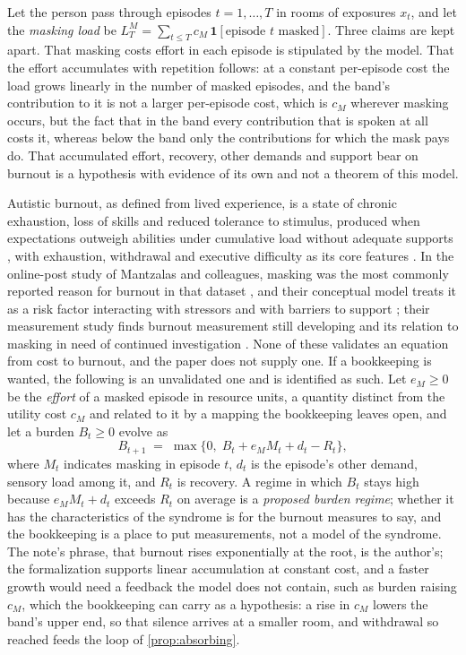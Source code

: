 Let the person pass through episodes $t = 1, \ldots, T$ in rooms of exposures $x_t$, and let the \emph{masking load} be $L^{M}_T = \sum_{t \le T} c_M\,\mathbf{1}[\text{episode } t \text{ masked}]$. Three claims are kept apart. That masking costs effort in each episode is stipulated by the model. That the effort accumulates with repetition follows: at a constant per-episode cost the load grows linearly in the number of masked episodes, and the band's contribution to it is not a larger per-episode cost, which is $c_M$ wherever masking occurs, but the fact that in the band every contribution that is spoken at all costs it, whereas below the band only the contributions for which the mask pays do. That accumulated effort, recovery, other demands and support bear on burnout is a hypothesis with evidence of its own and not a theorem of this model.

Autistic burnout, as defined from lived experience, is a state of chronic exhaustion, loss of skills and reduced tolerance to stimulus, produced when expectations outweigh abilities under cumulative load without adequate supports \cite{Raymaker2020}, with exhaustion, withdrawal and executive difficulty as its core features \cite{Higgins2021}. In the online-post study of Mantzalas and colleagues, masking was the most commonly reported reason for burnout in that dataset \cite{Mantzalas2022b}, and their conceptual model treats it as a risk factor interacting with stressors and with barriers to support \cite{Mantzalas2022a}; their measurement study finds burnout measurement still developing and its relation to masking in need of continued investigation \cite{Mantzalas2024}. None of these validates an equation from cost to burnout, and the paper does not supply one. If a bookkeeping is wanted, the following is an unvalidated one and is identified as such. Let $e_M \ge 0$ be the \emph{effort} of a masked episode in resource units, a quantity distinct from the utility cost $c_M$ and related to it by a mapping the bookkeeping leaves open, and let a burden $B_t \ge 0$ evolve as
\[
B_{t+1} \;=\; \max\{0,\; B_t + e_M M_t + d_t - R_t\},
\]
where $M_t$ indicates masking in episode $t$, $d_t$ is the episode's other demand, sensory load among it, and $R_t$ is recovery. A regime in which $B_t$ stays high because $e_M M_t + d_t$ exceeds $R_t$ on average is a \emph{proposed burden regime}; whether it has the characteristics of the syndrome is for the burnout measures to say, and the bookkeeping is a place to put measurements, not a model of the syndrome. The note's phrase, that burnout rises exponentially at the root, is the author's; the formalization supports linear accumulation at constant cost, and a faster growth would need a feedback the model does not contain, such as burden raising $c_M$, which the bookkeeping can carry as a hypothesis: a rise in $c_M$ lowers the band's upper end, so that silence arrives at a smaller room, and withdrawal so reached feeds the loop of \autoref{prop:absorbing}.

